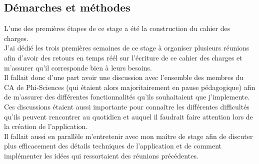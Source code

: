 \documentclass[11pt, twoside]{article}
\begin{document}
\subsection{Démarches et méthodes}
L'une des premières étapes de ce stage a été la construction du cahier des charges.
\vspace*{0.2cm}\\
J'ai dédié les trois  premières semaines de ce stage à organiser plusieurs réunions afin d'avoir des retours en temps réél sur l'écriture de ce cahier des charges et m'assurer qu'il corresponde bien à leurs besoins.\\
Il fallait donc d'une part avoir une discussion avec l'ensemble des membres du CA de Phi-Sciences (qui étaient alors majoritairement en pause pédagogique) afin de m'assurer des différentes fonctionnalités qu'ils souhaitaient que j'implemente. 
Ces discussions étaient aussi importante pour connaître les différentes difficultés qu'ils peuvent rencontrer au quotidien et auquel il faudrait faire attention lors de la création de l'application.\\
Il fallait aussi en parallèle m'entretenir avec mon maître de stage afin de discuter plus efficacement des détails techniques de l'application et de comment implémenter les idées qui ressortaient des réunions précédentes.\newpage
\end{document}
